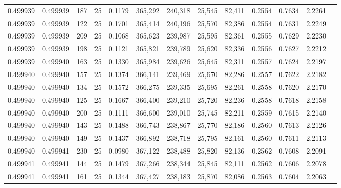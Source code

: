 \begin{tabular}{rrrrrrrrrrrrr}
0.499939 & 0.499939 &   187 &  25 &                                     0.1179 & 365,292 & 240,318 &  25,545 &  82,411 & 0.2554 & 0.7634 & 2.2261 \\
0.499939 & 0.499939 &   122 &  25 &                                     0.1701 & 365,414 & 240,196 &  25,570 &  82,386 & 0.2554 & 0.7631 & 2.2249 \\
0.499939 & 0.499939 &   209 &  25 &                                     0.1068 & 365,623 & 239,987 &  25,595 &  82,361 & 0.2555 & 0.7629 & 2.2230 \\
0.499939 & 0.499939 &   198 &  25 &                                     0.1121 & 365,821 & 239,789 &  25,620 &  82,336 & 0.2556 & 0.7627 & 2.2212 \\
0.499939 & 0.499940 &   163 &  25 &                                     0.1330 & 365,984 & 239,626 &  25,645 &  82,311 & 0.2557 & 0.7624 & 2.2197 \\
0.499940 & 0.499940 &   157 &  25 &                                     0.1374 & 366,141 & 239,469 &  25,670 &  82,286 & 0.2557 & 0.7622 & 2.2182 \\
0.499940 & 0.499940 &   134 &  25 &                                     0.1572 & 366,275 & 239,335 &  25,695 &  82,261 & 0.2558 & 0.7620 & 2.2170 \\
0.499940 & 0.499940 &   125 &  25 &                                     0.1667 & 366,400 & 239,210 &  25,720 &  82,236 & 0.2558 & 0.7618 & 2.2158 \\
0.499940 & 0.499940 &   200 &  25 &                                     0.1111 & 366,600 & 239,010 &  25,745 &  82,211 & 0.2559 & 0.7615 & 2.2140 \\
0.499940 & 0.499940 &   143 &  25 &                                     0.1488 & 366,743 & 238,867 &  25,770 &  82,186 & 0.2560 & 0.7613 & 2.2126 \\
0.499940 & 0.499940 &   149 &  25 &                                     0.1437 & 366,892 & 238,718 &  25,795 &  82,161 & 0.2560 & 0.7611 & 2.2113 \\
0.499940 & 0.499941 &   230 &  25 &                                     0.0980 & 367,122 & 238,488 &  25,820 &  82,136 & 0.2562 & 0.7608 & 2.2091 \\
0.499941 & 0.499941 &   144 &  25 &                                     0.1479 & 367,266 & 238,344 &  25,845 &  82,111 & 0.2562 & 0.7606 & 2.2078 \\
0.499941 & 0.499941 &   161 &  25 &                                     0.1344 & 367,427 & 238,183 &  25,870 &  82,086 & 0.2563 & 0.7604 & 2.2063 \\

\end{tabular}
